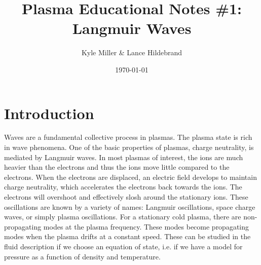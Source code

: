 \documentclass[12pt]{article}
\begin{document}
	
\title{\vspace{-5ex}Plasma Educational Notes \#1: Langmuir Waves\vspace{-1ex}}
\date{\vspace{-1ex}\today}
\author{Kyle Miller \& Lance Hildebrand}
\maketitle

\section*{Introduction}
Waves are a fundamental collective process in plasmas. The plasma state is rich in wave phenomena. One of the basic properties of plasmas, charge neutrality, is mediated by Langmuir waves. In most plasmas of interest, the ions are much heavier than the electrons and thus the ions move little compared to the electrons. When the electrons are displaced, an electric field develops to maintain charge neutrality, which accelerates the electrons back towards the ions. The electrons will overshoot and effectively slosh around the stationary ions. These oscillations are known by a variety of names: Langmuir oscillations, space charge waves, or simply plasma oscillations. For a stationary cold plasma, there are non-propagating modes at the plasma frequency. These modes become propagating modes when the plasma drifts at a constant speed. These can be studied in the fluid description if we choose an equation of state, i.e. if we have a model for pressure as a function of density and temperature.
\end{document}
